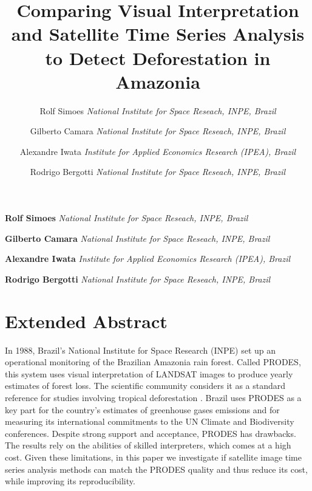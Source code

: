 \documentclass[11pt,]{article}
\title{Comparing Visual Interpretation and Satellite Time Series Analysis to
Detect Deforestation in Amazonia  }
\author{\Large Rolf Simoes\vspace{0.05in} \newline\normalsize\emph{National Institute for Space Reseach, INPE, Brazil}   \and \Large Gilberto Camara\vspace{0.05in} \newline\normalsize\emph{National Institute for Space Reseach, INPE, Brazil}   \and \Large Alexandre Iwata\vspace{0.05in} \newline\normalsize\emph{Institute for Applied Economics Research (IPEA), Brazil}   \and \Large Rodrigo Bergotti\vspace{0.05in} \newline\normalsize\emph{National Institute for Space Reseach, INPE, Brazil}  }
\date{}
\newcommand*{\authorfont}{\fontfamily{phv}\selectfont}
\begin{document}
%

{%
\setlength{\parindent}{0pt}
\thispagestyle{plain}
{\fontsize{18}{20}\selectfont\raggedright
\maketitle  %

}

{
   \vskip 13.5pt\relax \normalsize\fontsize{11}{12}
\textbf{\authorfont Rolf Simoes} \hskip 15pt \emph{\small National Institute for Space Reseach, INPE, Brazil}   \par \textbf{\authorfont Gilberto Camara} \hskip 15pt \emph{\small National Institute for Space Reseach, INPE, Brazil}   \par \textbf{\authorfont Alexandre Iwata} \hskip 15pt \emph{\small Institute for Applied Economics Research (IPEA), Brazil}   \par \textbf{\authorfont Rodrigo Bergotti} \hskip 15pt \emph{\small National Institute for Space Reseach, INPE, Brazil}   

}

}






\vskip 6.5pt

\setlength{\parskip}{6pt}
\noindent  \section{Extended Abstract}\label{extended-abstract}

In 1988, Brazil's National Institute for Space Research (INPE) set up an
operational monitoring of the Brazilian Amazonia rain forest. Called
PRODES, this system uses visual interpretation of LANDSAT images to
produce yearly estimates of forest loss. The scientific community
considers it as a standard reference for studies involving tropical
deforestation \citep{Morton2006}\citep{Hansen2013}. Brazil uses PRODES
as a key part for the country's estimates of greenhouse gases emissions
and for measuring its international commitments to the UN Climate and
Biodiversity conferences. Despite strong support and acceptance, PRODES
has drawbacks. The results rely on the abilities of skilled
interpreters, which comes at a high cost. Given these limitations, in
this paper we investigate if satellite image time series analysis
methods can match the PRODES quality and thus reduce its cost, while
improving its reproducibility.
\end{document}
